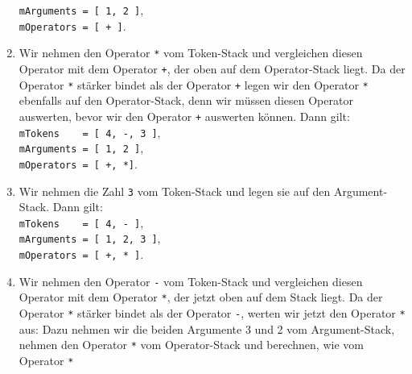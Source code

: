 \begin{enumerate}
      \hspace*{1.3cm} \texttt{mArguments = [ 1, 2 ]}, \\[0.1cm]
      \hspace*{1.3cm} \texttt{mOperators = [ + ]}. 
\item Wir nehmen den Operator \texttt{*} vom Token-Stack und vergleichen diesen Operator mit
      dem Operator \texttt{+}, der oben auf dem Operator-Stack liegt.
      Da der Operator \texttt{*} st\"arker bindet als der Operator \texttt{+}
      legen wir den Operator \texttt{*} ebenfalls auf den Operator-Stack, denn wir 
      m\"ussen diesen Operator auswerten, bevor wir den Operator \texttt{+} auswerten
      k\"onnen.
      Dann gilt: \\[0.1cm]
      \hspace*{1.3cm} \texttt{mTokens \ \ \ = [ 4, -, 3 ]}, \\[0.1cm]
      \hspace*{1.3cm} \texttt{mArguments = [ 1, 2 ]}, \\[0.1cm]
      \hspace*{1.3cm} \texttt{mOperators = [ +, *]}. 
\item Wir nehmen  die Zahl \texttt{3} vom Token-Stack und legen sie auf den Argument-Stack.
      Dann gilt: \\[0.1cm]
      \hspace*{1.3cm} \texttt{mTokens \ \ \ = [ 4, - ]}, \\[0.1cm]
      \hspace*{1.3cm} \texttt{mArguments = [ 1, 2, 3 ]}, \\[0.1cm]
      \hspace*{1.3cm} \texttt{mOperators = [ +, * ]}. 
\item Wir nehmen den Operator \texttt{-} vom Token-Stack und vergleichen diesen Operator mit dem
      Operator \texttt{*}, der jetzt oben auf dem Stack liegt.  Da der Operator
      \texttt{*} st\"arker bindet als der Operator \texttt{-},
      werten wir jetzt den Operator \texttt{*} aus:  Dazu      
      nehmen wir die  beiden Argumente 3 und 2 vom Argument-Stack, nehmen den Operator
      \texttt{*} vom Operator-Stack und berechnen, wie vom Operator \texttt{*}

\end{enumerate}
